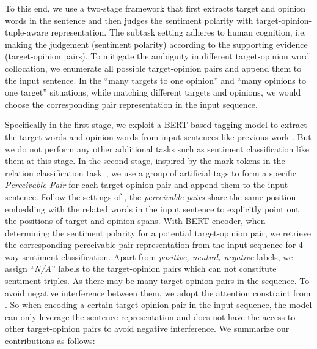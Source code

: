 \documentclass[11pt]{article}
\begin{document}
To this end, we use a two-stage framework that first extracts target and opinion words in the sentence and then judges the sentiment polarity with target-opinion-tuple-aware representation. 
The subtask setting adheres to human cognition, i.e. making the judgement (sentiment polarity) according to the supporting evidence (target-opinion pairs). 
To mitigate the ambiguity in different target-opinion word collocation, we enumerate all possible target-opinion pairs and append them to the input sentence.
In the ``many targets to one opinion'' and ``many opinions to one target'' situations, while matching different targets and opinions, we would choose the corresponding pair representation in the input sequence.


Specifically in the first stage, we exploit a BERT-based \cite{devlin2018bert}
tagging model to extract the target words and opinion words from input sentences like previous work \cite{peng2020knowing,xu2020position}. 
But we do not perform any other additional tasks such as sentiment classification like them at this stage. 
In the second stage, 
inspired by the mark tokens in the relation classification task~\cite{zhang2019ernie,soares2019matching,zhong2020frustratingly}, 
we use a group of artificial tags to form a specific \textit{Perceivable Pair} for each target-opinion pair and append them to the input sentence. 
Follow the settings of \cite{zhong2020frustratingly}, 
the \textit{perceivable pairs} share the same position embedding with the related words in the input sentence to explicitly point out the positions of target and opinion spans. 
With BERT encoder, when determining the sentiment polarity for a potential target-opinion pair, we retrieve the corresponding perceivable pair representation from the input sequence for 4-way sentiment classification. Apart from \textit{positive, neutral, negative} labels, we assign ``\textit{N/A}'' labels to the target-opinion pairs which can not constitute sentiment triples.
As there may be many target-opinion pairs in the sequence. To avoid negative interference between them, we adopt the attention constraint from \cite{zhong2020frustratingly}.
So when encoding a certain target-opinion pair in the input sequence, the model can only leverage the sentence representation and does not have the access to other target-opinion pairs to avoid negative interference. 
We summarize our contributions as follows:
\end{document}
